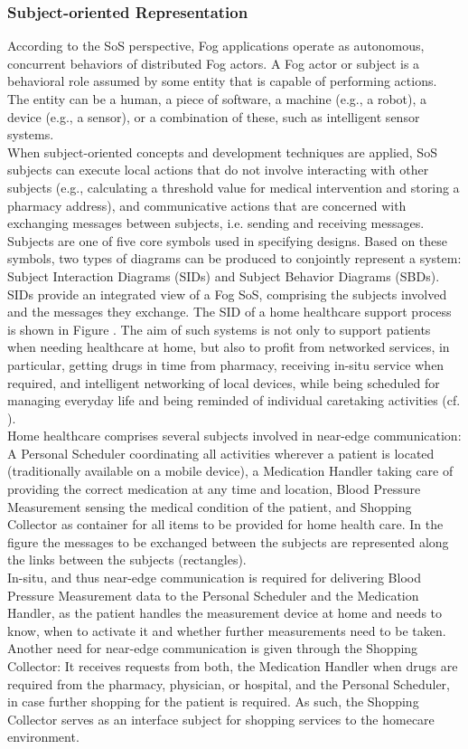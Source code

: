 \subsubsection{Subject-oriented Representation}
According to the SoS perspective, Fog applications operate as autonomous, concurrent behaviors of distributed Fog actors. A Fog actor or subject is a behavioral role assumed by some entity that is capable of performing actions. The entity can be a human, a piece of software, a machine (e.g., a robot), a device (e.g., a sensor), or a combination of these, such as intelligent sensor systems.
\\
When subject-oriented concepts and development techniques are applied, SoS subjects can execute local actions that do not involve interacting with other subjects (e.g., calculating a threshold value for medical intervention and storing a pharmacy address), and communicative actions that are concerned with exchanging messages between subjects, i.e. sending and receiving messages. Subjects are one of five core symbols used in specifying designs. Based on these symbols, two types of diagrams can be produced to conjointly represent a system: Subject Interaction Diagrams (SIDs) and Subject Behavior Diagrams (SBDs).
\\
SIDs provide an integrated view of a Fog SoS, comprising the subjects involved and the messages they exchange. The SID of a home healthcare support process is shown in Figure . The aim of such systems is not only to support patients when needing healthcare at home, but also to profit from networked services, in particular, getting drugs in time from pharmacy, receiving in-situ service when required, and intelligent networking of local devices, while being scheduled for managing everyday life and being reminded of individual caretaking activities (cf. \cite{article:DesignHealth}).  
\\
Home healthcare comprises several subjects involved in near-edge communication: A Personal Scheduler coordinating all activities wherever a patient is located (traditionally available on a mobile device), a Medication Handler taking care of providing the correct medication at any time and location, Blood Pressure Measurement sensing the medical condition of the patient, and Shopping Collector as container for all items to be provided for home health care. In the figure the messages to be exchanged between the subjects are represented along the links between the subjects (rectangles).
\\
In-situ, and thus near-edge communication is required for delivering Blood Pressure Measurement data to the Personal Scheduler and the Medication Handler, as the patient handles the measurement device at home and needs to know, when to activate it and whether further measurements need to be taken. Another need for near-edge communication is given through the Shopping Collector: It receives requests from both, the Medication Handler when drugs are required from the pharmacy, physician, or hospital, and the Personal Scheduler, in case further shopping for the patient is required. As such, the Shopping Collector serves as an interface subject for shopping services to the homecare environment.

